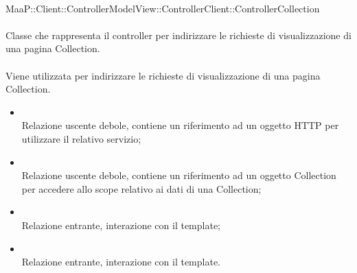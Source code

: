	\\
	MaaP::Client::ControllerModelView::ControllerClient::ControllerCollection\\
	\\
	Classe che rappresenta il controller per indirizzare le richieste di visualizzazione di una pagina Collection.\\
	\\
	Viene utilizzata per indirizzare le richieste di visualizzazione di una pagina Collection.\\
	\begin{itemize}
	\item{}\\
	Relazione uscente debole, contiene un riferimento ad un oggetto HTTP per utilizzare il relativo servizio;
	\item{}\\
	Relazione uscente debole, contiene un riferimento ad un oggetto Collection per accedere allo scope relativo ai dati di una Collection;
	\item{}\\
	Relazione entrante, interazione con il template;
	\item{}\\
	Relazione entrante, interazione con il template.
	\end{itemize}
	
